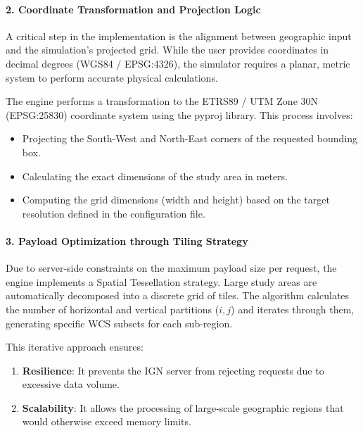 \paragraph{2. Coordinate Transformation and Projection Logic}

A critical step in the implementation is the alignment between geographic input and the simulation's projected grid. 
While the user provides coordinates in decimal degrees (WGS84 / EPSG:4326), the simulator requires a planar, metric 
system to perform accurate physical calculations.

The engine performs a transformation to the ETRS89 / UTM Zone 30N (EPSG:25830) coordinate system using the pyproj library. 
This process involves:

\begin{itemize}
    \item Projecting the South-West and North-East corners of the requested bounding box.
    \item Calculating the exact dimensions of the study area in meters.
    \item Computing the grid dimensions (width and height) based on the target resolution defined in the configuration file.
\end{itemize}


\paragraph{3. Payload Optimization through Tiling Strategy}

Due to server-side constraints on the maximum payload size per request, the engine implements a Spatial Tessellation 
strategy. Large study areas are automatically decomposed into a discrete grid of tiles. The algorithm calculates the 
number of horizontal and vertical partitions ($i, j$) and iterates through them, generating specific WCS subsets for 
each sub-region.

This iterative approach ensures:

\begin{enumerate}
    \item \textbf{Resilience}: It prevents the IGN server from rejecting requests due to excessive data volume.
    \item \textbf{Scalability}: It allows the processing of large-scale geographic regions that would otherwise exceed 
    memory limits.
\end{enumerate}

